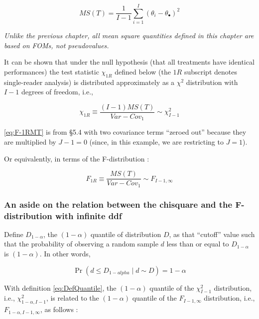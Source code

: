 \documentclass[
]{book}
\begin{document}
\begin{equation}
MS(T)=\frac{1}{I-1}\sum_{i=1}^{I}(\theta_i-\theta_\bullet)^2
\label{eq:DefinitionMST}
\end{equation}

\emph{Unlike the previous chapter, all mean square quantities defined in this chapter are based on FOMs, not pseudovalues.}

It can be shown that under the null hypothesis (that all treatments have identical performances) the test statistic \(\chi_{1R}\) defined below (the \(1R\) subscript denotes single-reader analysis) is distributed approximately as a \(\chi^2\) distribution with \(I-1\) degrees of freedom, i.e.,

\begin{equation}
\chi_{1R} \equiv \frac{(I-1)MS(T)}{Var-Cov_1} \sim \chi_{I-1}^{2}
\label{eq:F-1RMT}
\end{equation}

\eqref{eq:F-1RMT} is from §5.4 \citep{RN1865} with two covariance terms ``zeroed out'' because they are multiplied by \(J-1 = 0\) (since, in this example, we are restricting to \(J=1\)).

Or equivalently, in terms of the F-distribution \citep{RN1772}:

\begin{equation}
F_{1R} \equiv \frac{MS(T)}{Var-Cov_1} \sim F_{I-1, \infty}
\label{eq:DefF-1RMT}
\end{equation}

\hypertarget{an-aside-on-the-relation-between-the-chisquare-and-the-f-distribution-with-infinite-ddf}{%
\subsubsection{An aside on the relation between the chisquare and the F-distribution with infinite ddf}\label{an-aside-on-the-relation-between-the-chisquare-and-the-f-distribution-with-infinite-ddf}}

Define \(D_{1-\alpha}\), the \((1-\alpha)\) quantile of distribution \(D\), as that ``cutoff'' value such that the probability of observing a random sample \(d\) less than or equal to \(D_{1-\alpha}\) is \((1-\alpha)\). In other words,

\begin{equation}
\Pr(d\leq D_{1-alpha} \mid d \sim D)=1-\alpha
\label{eq:DefQuantile}
\end{equation}

With definition \eqref{eq:DefQuantile}, the \((1-\alpha)\) quantile of the \(\chi_{I-1}^2\) distribution, i.e., \(\chi_{1-\alpha,I-1}^2\), is related to the \((1-\alpha)\) quantile of the \(F_{I-1,\infty}\) distribution, i.e., \(F_{1-\alpha,I-1,\infty}\), as follows \citep[see][Eq. 22]{RN1772}:
\end{document}
